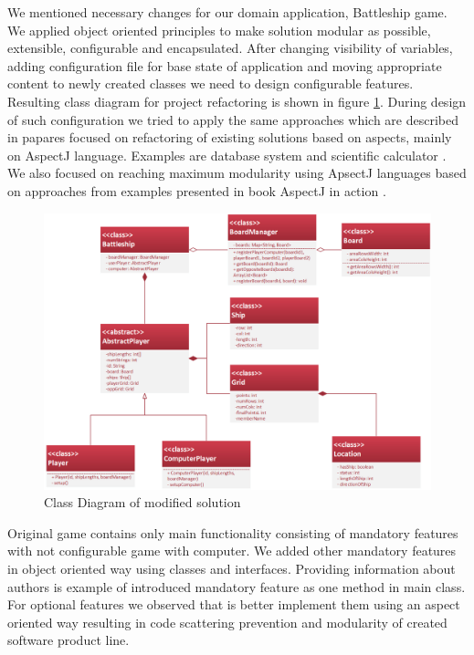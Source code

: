 \documentclass[11pt,slovak,a4paper,twoside]{article}
\begin{document}
We mentioned necessary changes for our domain application, Battleship game. We applied object oriented principles to make solution modular as possible, extensible, configurable and encapsulated. After changing visibility of variables, adding configuration file for base state of application and moving appropriate content to newly created classes we need to design configurable features. Resulting class diagram for project refactoring is shown in figure \ref{refactoredSchema}. During design of such configuration we tried to apply the same approaches which are described in papares focused on refactoring of existing solutions based on aspects, mainly on AspectJ language. Examples are database system \cite{kastner_case_2007} and scientific calculator \cite{botterweck_automating_2009}. We also focused on reaching maximum modularity using ApsectJ languages based on approaches from examples presented in book AspectJ in action \cite{laddad_aspectj_2003}.


\begin{figure}[t]  %
					\begin{center}
									\includegraphics[width=\linewidth]{fig/refactoredSchema.png}
									\caption{Class Diagram of modified solution}
									\label{refactoredSchema}
					\end{center}
\end{figure}

Original game contains only main functionality consisting of mandatory features with not configurable game with computer. We added other mandatory features in object oriented way using classes and interfaces. Providing information about authors is example of introduced mandatory feature as one method in main class. For optional features we observed that is better implement them using an aspect oriented way resulting in code scattering prevention and modularity of created software product line. 
\end{document}
